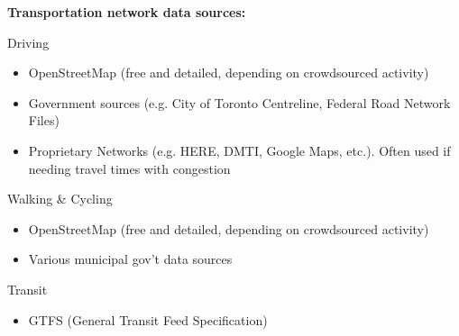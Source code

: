 \documentclass[aspectratio=169]{beamer}
\begin{document}
\begin{frame}
	
	\textbf{Transportation network data sources:}
	
	\vspace{2mm}
	
	Driving
	\begin{itemize}
		\item OpenStreetMap (free and detailed, depending on crowdsourced activity)
		\item Government sources (e.g. City of Toronto Centreline, Federal Road Network Files)
		\item Proprietary Networks (e.g. HERE, DMTI, Google Maps, etc.). Often used if needing travel times with congestion
	\end{itemize}

	Walking \& Cycling
	\begin{itemize}
		\item OpenStreetMap (free and detailed, depending on crowdsourced activity)
		\item Various municipal gov't data sources
	\end{itemize}

	Transit 
	\begin{itemize}
		\item GTFS (General Transit Feed Specification)
	\end{itemize}
	
\end{frame}
\end{document}
